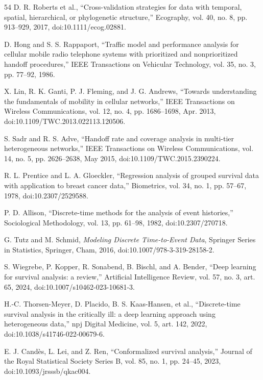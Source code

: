 \begin{thebibliography}{54}
 D. R. Roberts et al., ``Cross-validation strategies for data with temporal, spatial, hierarchical, or phylogenetic structure,'' Ecography, vol. 40, no. 8, pp. 913--929, 2017, doi:10.1111/ecog.02881.

 D. Hong and S. S. Rappaport, ``Traffic model and performance analysis for cellular mobile radio telephone systems with prioritized and nonprioritized handoff procedures,'' IEEE Transactions on Vehicular Technology, vol. 35, no. 3, pp. 77--92, 1986.

 X. Lin, R. K. Ganti, P. J. Fleming, and J. G. Andrews, ``Towards understanding the fundamentals of mobility in cellular networks,'' IEEE Transactions on Wireless Communications, vol. 12, no. 4, pp. 1686--1698, Apr. 2013, doi:10.1109/TWC.2013.022113.120506.

 S. Sadr and R. S. Adve, ``Handoff rate and coverage analysis in multi-tier heterogeneous networks,'' IEEE Transactions on Wireless Communications, vol. 14, no. 5, pp. 2626--2638, May 2015, doi:10.1109/TWC.2015.2390224.

 R. L. Prentice and L. A. Gloeckler, ``Regression analysis of grouped survival data with application to breast cancer data,'' Biometrics, vol. 34, no. 1, pp. 57--67, 1978, doi:10.2307/2529588.

 P. D. Allison, ``Discrete-time methods for the analysis of event histories,'' Sociological Methodology, vol. 13, pp. 61--98, 1982, doi:10.2307/270718.

 G. Tutz and M. Schmid, \textit{Modeling Discrete Time-to-Event Data}, Springer Series in Statistics, Springer, Cham, 2016, doi:10.1007/978-3-319-28158-2.

 S. Wiegrebe, P. Kopper, R. Sonabend, B. Bischl, and A. Bender, ``Deep learning for survival analysis: a review,'' Artificial Intelligence Review, vol. 57, no. 3, art. 65, 2024, doi:10.1007/s10462-023-10681-3.

 H.-C. Thorsen-Meyer, D. Placido, B. S. Kaas-Hansen, et al., ``Discrete-time survival analysis in the critically ill: a deep learning approach using heterogeneous data,'' npj Digital Medicine, vol. 5, art. 142, 2022, doi:10.1038/s41746-022-00679-6.

 E. J. Cand\`es, L. Lei, and Z. Ren, ``Conformalized survival analysis,'' Journal of the Royal Statistical Society Series B, vol. 85, no. 1, pp. 24--45, 2023, doi:10.1093/jrsssb/qkac004.


\end{thebibliography}
